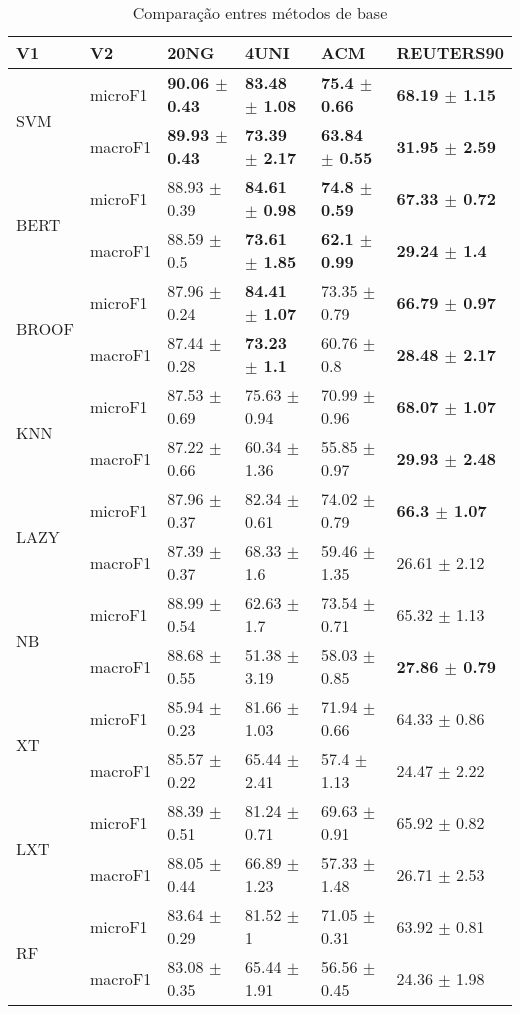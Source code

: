 \documentclass[]{article}
\begin{document}
\begin{table}[ht]
\centering
\begin{tabular}{llllll}
  \hline
V1 & V2 & 20NG & 4UNI & ACM & REUTERS90 \\ 
  \cline{3-6} \hline
\multirow{2}{*}{SVM} & microF1 & \bf{90.06 $\pm$  0.43} & \bf{83.48 $\pm$  1.08} & \bf{75.4 $\pm$  0.66} & \bf{68.19 $\pm$  1.15} \\ 
   & macroF1 & \bf{89.93 $\pm$  0.43} & \bf{73.39 $\pm$  2.17} & \bf{63.84 $\pm$  0.55} & \bf{31.95 $\pm$  2.59} \\ 
   \cline{3-6}\multirow{2}{*}{BERT} & microF1 & 88.93 $\pm$  0.39 & \bf{84.61 $\pm$  0.98} & \bf{74.8 $\pm$  0.59} & \bf{67.33 $\pm$  0.72} \\ 
   & macroF1 & 88.59 $\pm$  0.5 & \bf{73.61 $\pm$  1.85} & \bf{62.1 $\pm$  0.99} & \bf{29.24 $\pm$  1.4} \\ 
   \cline{3-6}\multirow{2}{*}{BROOF} & microF1 & 87.96 $\pm$  0.24 & \bf{84.41 $\pm$  1.07} & 73.35 $\pm$  0.79 & \bf{66.79 $\pm$  0.97} \\ 
   & macroF1 & 87.44 $\pm$  0.28 & \bf{73.23 $\pm$  1.1} & 60.76 $\pm$  0.8 & \bf{28.48 $\pm$  2.17} \\ 
   \cline{3-6}\multirow{2}{*}{KNN} & microF1 & 87.53 $\pm$  0.69 & 75.63 $\pm$  0.94 & 70.99 $\pm$  0.96 & \bf{68.07 $\pm$  1.07} \\ 
   & macroF1 & 87.22 $\pm$  0.66 & 60.34 $\pm$  1.36 & 55.85 $\pm$  0.97 & \bf{29.93 $\pm$  2.48} \\ 
   \cline{3-6}\multirow{2}{*}{LAZY} & microF1 & 87.96 $\pm$  0.37 & 82.34 $\pm$  0.61 & 74.02 $\pm$  0.79 & \bf{66.3 $\pm$  1.07} \\ 
   & macroF1 & 87.39 $\pm$  0.37 & 68.33 $\pm$  1.6 & 59.46 $\pm$  1.35 & 26.61 $\pm$  2.12 \\ 
   \cline{3-6}\multirow{2}{*}{NB} & microF1 & 88.99 $\pm$  0.54 & 62.63 $\pm$  1.7 & 73.54 $\pm$  0.71 & 65.32 $\pm$  1.13 \\ 
   & macroF1 & 88.68 $\pm$  0.55 & 51.38 $\pm$  3.19 & 58.03 $\pm$  0.85 & \bf{27.86 $\pm$  0.79} \\ 
   \cline{3-6}\multirow{2}{*}{XT} & microF1 & 85.94 $\pm$  0.23 & 81.66 $\pm$  1.03 & 71.94 $\pm$  0.66 & 64.33 $\pm$  0.86 \\ 
   & macroF1 & 85.57 $\pm$  0.22 & 65.44 $\pm$  2.41 & 57.4 $\pm$  1.13 & 24.47 $\pm$  2.22 \\ 
   \cline{3-6}\multirow{2}{*}{LXT} & microF1 & 88.39 $\pm$  0.51 & 81.24 $\pm$  0.71 & 69.63 $\pm$  0.91 & 65.92 $\pm$  0.82 \\ 
   & macroF1 & 88.05 $\pm$  0.44 & 66.89 $\pm$  1.23 & 57.33 $\pm$  1.48 & 26.71 $\pm$  2.53 \\ 
   \cline{3-6}\multirow{2}{*}{RF} & microF1 & 83.64 $\pm$  0.29 & 81.52 $\pm$  1 & 71.05 $\pm$  0.31 & 63.92 $\pm$  0.81 \\ 
   & macroF1 & 83.08 $\pm$  0.35 & 65.44 $\pm$  1.91 & 56.56 $\pm$  0.45 & 24.36 $\pm$  1.98 \\ 
   \cline{3-6}\end{tabular}
\caption{Comparação entres métodos de base} 
\label{tab:base}
\end{table}
\end{document}
